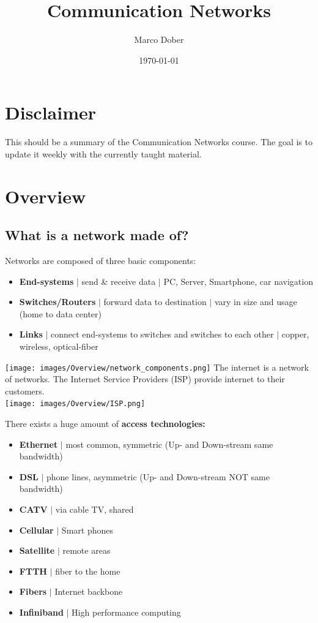 \documentclass[a4paper, fontsize=8pt, landscape, DIV=1]{scrartcl}
\title{Communication Networks}
\author{Marco Dober}
\date{\today}
\begin{document}
	\setcounter{secnumdepth}{3} %
	\begin{multicols*}{4}
		\section*{Disclaimer}
			This should be a summary of the Communication Networks course. The goal is to update it weekly with the currently taught material.  	
			\newpage

		\maketitle 
		\thispagestyle{fancy}
		
		\section{Overview}
			\subsection{What is a network made of?}
				Networks are composed of three basic components:
				\begin{itemize}
					\item \textbf{End-systems} $\vert$ send \& receive data $\vert$  PC, Server, Smartphone, car navigation
					\item \textbf{Switches/Routers} $\vert$ forward data to destination $\vert$ vary in size and usage (home to data center)
					\item \textbf{Links} $\vert$ connect end-systems to switches and switches to each other $\vert$ copper, wireless, optical-fiber
				\end{itemize}
				\texttt{[image: images/Overview/network\_components.png]}
				The internet is a network of networks. The Internet Service Providers (ISP) provide internet to their customers.\\
				\texttt{[image: images/Overview/ISP.png]}
				\columnbreak
			
				There exists a huge amount of \textbf{access technologies: }
				\begin{itemize}[noitemsep]
					\item \textbf{Ethernet} $\vert$ most common, symmetric (Up- and Down-stream same bandwidth)
					\item \textbf{DSL} $\vert$ phone lines, asymmetric (Up- and Down-stream NOT same bandwidth)
					\item \textbf{CATV} $\vert$ via cable TV, shared
					\item \textbf{Cellular} $\vert$ Smart phones 
					\item \textbf{Satellite} $\vert$ remote areas
					\item \textbf{FTTH} $\vert$ fiber to the home
					\item \textbf{Fibers} $\vert$ Internet backbone 
					\item \textbf{Infiniband} $\vert$ High performance computing 
				\end{itemize}

\end{multicols*}
\end{document}
